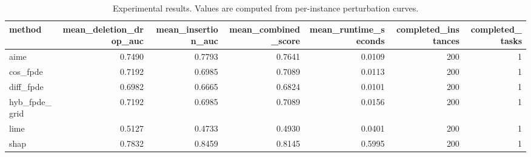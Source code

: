 \begin{table}[t]
\caption{Experimental results. Values are computed from per-instance perturbation curves.}
\label{tab:main_results_computed}
\centering
\begin{tabular}{lrrrrrr}
\toprule
method & mean\_deletion\_drop\_auc & mean\_insertion\_auc & mean\_combined\_score & mean\_runtime\_seconds & completed\_instances & completed\_tasks \\
\midrule
aime & 0.7490 & 0.7793 & 0.7641 & 0.0109 & 200 & 1 \\
cos\_fpde & 0.7192 & 0.6985 & 0.7089 & 0.0113 & 200 & 1 \\
diff\_fpde & 0.6982 & 0.6665 & 0.6824 & 0.0101 & 200 & 1 \\
hyb\_fpde\_grid & 0.7192 & 0.6985 & 0.7089 & 0.0156 & 200 & 1 \\
lime & 0.5127 & 0.4733 & 0.4930 & 0.0401 & 200 & 1 \\
shap & 0.7832 & 0.8459 & 0.8145 & 0.5995 & 200 & 1 \\
\bottomrule
\end{tabular}

\end{table}
